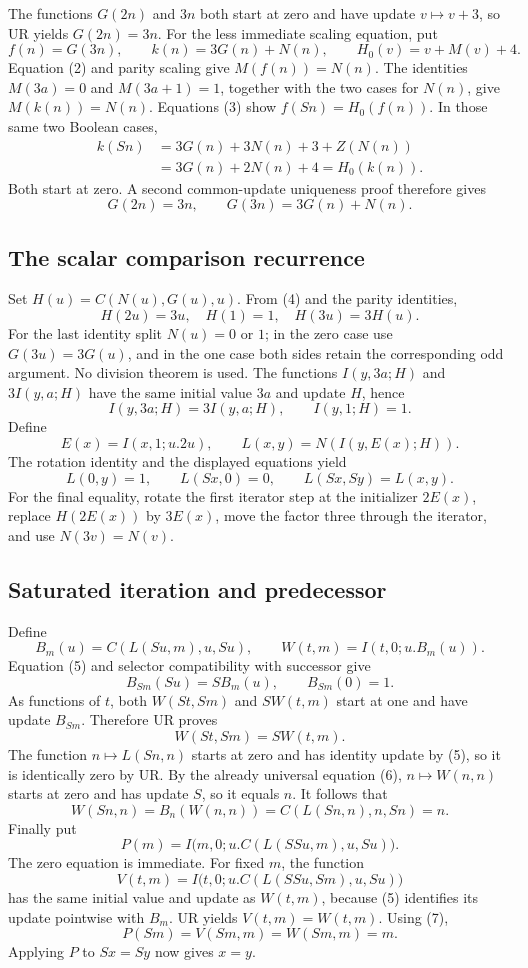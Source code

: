 \documentclass[11pt]{article}
\begin{document}
The functions $G(2n)$ and $3n$ both start at zero and have update
$v\mapsto v+3$, so UR yields $G(2n)=3n$.
For the less immediate scaling equation, put
\[
 f(n)=G(3n),\qquad k(n)=3G(n)+N(n),\qquad H_0(v)=v+M(v)+4.
\]
Equation (2) and parity scaling give $M(f(n))=N(n)$.
The identities $M(3a)=0$ and $M(3a+1)=1$, together with the two cases
for $N(n)$, give $M(k(n))=N(n)$.
Equations (3) show $f(Sn)=H_0(f(n))$.  In those same two Boolean cases,
\[
 \begin{split}
 k(Sn)&=3G(n)+3N(n)+3+Z(N(n))\\
      &=3G(n)+2N(n)+4=H_0(k(n)).
 \end{split}
\]
Both start at zero.  A second common-update uniqueness proof therefore
gives
\[
                  G(2n)=3n,\qquad G(3n)=3G(n)+N(n).       \tag{4}
\]

\subsection{The scalar comparison recurrence}
Set $H(u)=C(N(u),G(u),u)$.  From (4) and the parity identities,
\[
                 H(2u)=3u,\quad H(1)=1,\quad H(3u)=3H(u).
\]
For the last identity split $N(u)=0$ or $1$; in the zero case use
$G(3u)=3G(u)$, and in the one case both sides retain the corresponding
odd argument.  No division theorem is used.
The functions $I(y,3a;H)$ and $3I(y,a;H)$ have the same initial
value $3a$ and update $H$, hence
\[
 I(y,3a;H)=3I(y,a;H),\qquad I(y,1;H)=1.
\]
Define
\[
 E(x)=I(x,1;u.2u),\qquad L(x,y)=N(I(y,E(x);H)).
\]
The rotation identity and the displayed equations yield
\[
 L(0,y)=1,\qquad L(Sx,0)=0,\qquad L(Sx,Sy)=L(x,y).        \tag{5}
\]
For the final equality, rotate the first iterator step at the initializer
$2E(x)$, replace $H(2E(x))$ by $3E(x)$, move the factor three through
the iterator, and use $N(3v)=N(v)$.

\subsection{Saturated iteration and predecessor}
Define
\[
 B_m(u)=C(L(Su,m),u,Su),\qquad W(t,m)=I(t,0;u.B_m(u)).
\]
Equation (5) and selector compatibility with successor give
\[
 B_{Sm}(Su)=S B_m(u),\qquad B_{Sm}(0)=1.
\]
As functions of $t$, both $W(St,Sm)$ and $S W(t,m)$ start at one
and have update $B_{Sm}$.  Therefore UR proves
\[
                             W(St,Sm)=S W(t,m).           \tag{6}
\]
The function $n\mapsto L(Sn,n)$ starts at zero and has identity update
by (5), so it is identically zero by UR.  By the already universal
equation (6), $n\mapsto W(n,n)$ starts at zero and has update $S$,
so it equals $n$.  It follows that
\[
 W(Sn,n)=B_n(W(n,n))=C(L(Sn,n),n,Sn)=n.                   \tag{7}
\]
Finally put
\[
 P(m)=I\bigl(m,0;u.C(L(SSu,m),u,Su)\bigr).
\]
The zero equation is immediate.  For fixed $m$, the function
\[
 V(t,m)=I\bigl(t,0;u.C(L(SSu,Sm),u,Su)\bigr)
\]
has the same initial value and update as $W(t,m)$, because (5)
identifies its update pointwise with $B_m$.  UR yields $V(t,m)=W(t,m)$.
Using (7),
\[
 P(Sm)=V(Sm,m)=W(Sm,m)=m.
\]
Applying $P$ to $Sx=Sy$ now gives $x=y$.
\end{document}
